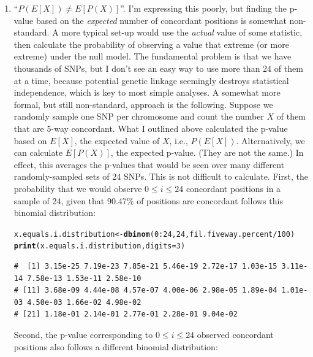 \documentclass{article}\usepackage[]{graphicx}\usepackage[]{color}
\makeatletter
\newcommand{\hlnum}[1]{\textcolor[rgb]{0.686,0.059,0.569}{#1}}%
\newcommand{\hlopt}[1]{\textcolor[rgb]{0,0,0}{#1}}%
\newcommand{\hlstd}[1]{\textcolor[rgb]{0.345,0.345,0.345}{#1}}%
\newcommand{\hlkwb}[1]{\textcolor[rgb]{0.69,0.353,0.396}{#1}}%
\newcommand{\hlkwc}[1]{\textcolor[rgb]{0.333,0.667,0.333}{#1}}%
\newcommand{\hlkwd}[1]{\textcolor[rgb]{0.737,0.353,0.396}{\textbf{#1}}}%
\newenvironment{kframe}{%
 \def\at@end@of@kframe{}%
 \ifinner\ifhmode%
  \def\at@end@of@kframe{\end{minipage}}%
  \begin{minipage}{\columnwidth}%
 \fi\fi%
 \def\FrameCommand##1{\hskip\@totalleftmargin \hskip-\fboxsep
 \colorbox{shadecolor}{##1}\hskip-\fboxsep
     \hskip-\linewidth \hskip-\@totalleftmargin \hskip\columnwidth}%
 \MakeFramed {\advance\hsize-\width
   \@totalleftmargin\z@ \linewidth\hsize
   \@setminipage}}%
 {\par\unskip\endMakeFramed%
 \at@end@of@kframe}
\newenvironment{knitrout}{}{} %
\makeatother
\begin{document}
\begin{enumerate}
  \item ``$P(E[X]) \neq E[P(X)]$''.  I'm expressing this poorly, but finding the p-value based on the \emph{expected} number of concordant positions is somewhat non-standard.  A more typical set-up would use the \emph{actual} value of some statistic, then calculate the probability of observing a value that extreme (or more extreme) under the null model.  The fundamental problem is that we have thousands of SNPs, but I don't see an easy way to use more than 24 of them at a time, because potential genetic linkage seemingly destroys statistical independence, which is key to most simple analyses.  
A somewhat more formal, but still non-standard, approach is the following.  Suppose we randomly sample one SNP per chromosome and count the number $X$ of them that are 5-way concordant.  What I outlined above calculated the p-value based on $E[X]$, the expected value of $X$, i.e., $P(E[X])$.  Alternatively, we can calculate $E[P(X)]$, the expected p-value.  (They are not the same.)  In effect, this averages the p-values that would be seen over many different randomly-sampled sets of 24 SNPs.  This is not difficult to calculate.  First, the probability that we would observe $0 \leq i \leq 24$ concordant positions in a sample of 24, given that 90.47\% of positions are concordant follows this binomial distribution:

\begin{knitrout}\footnotesize
{}\color{fgcolor}\begin{kframe}
\begin{alltt}
\hlstd{x.equals.i.distribution} \hlkwb{<-} \hlkwd{dbinom}\hlstd{(}\hlnum{0}\hlopt{:}\hlnum{24}\hlstd{,} \hlnum{24}\hlstd{, fil.fiveway.percent}\hlopt{/}\hlnum{100}\hlstd{)}
\hlkwd{print}\hlstd{(x.equals.i.distribution,} \hlkwc{digits}\hlstd{=}\hlnum{3}\hlstd{)}
\end{alltt}
\begin{verbatim}
#  [1] 3.15e-25 7.19e-23 7.85e-21 5.46e-19 2.72e-17 1.03e-15 3.11e-14 7.58e-13 1.53e-11 2.58e-10
# [11] 3.68e-09 4.44e-08 4.57e-07 4.00e-06 2.98e-05 1.89e-04 1.01e-03 4.50e-03 1.66e-02 4.98e-02
# [21] 1.18e-01 2.14e-01 2.77e-01 2.28e-01 9.04e-02
\end{verbatim}
\end{kframe}
\end{knitrout}

Second, the p-value corresponding to $0 \leq i \leq 24$ observed concordant positions also follows a different binomial distribution:


\end{enumerate}
\end{document}
